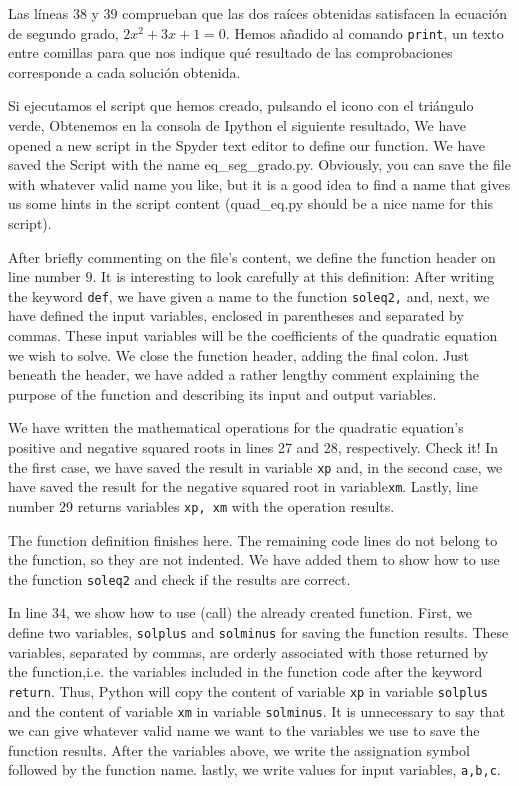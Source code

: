 \begin{paracol}{2}
     Las líneas $38$ y $39$ comprueban que las dos raíces obtenidas satisfacen la ecuación de segundo grado, $2x^2+3x+1 = 0$. Hemos añadido al comando \texttt{print}, un texto entre comillas para que nos indique qué resultado de las comprobaciones corresponde a cada solución obtenida.

     Si ejecutamos el script que hemos creado, pulsando el icono con el triángulo verde, Obtenemos en la consola de Ipython el siguiente resultado,
     \switchcolumn
     We have opened a new script in the Spyder text editor to define our function. We have saved the Script with the name {eq\_seg\_grado.py}. Obviously, you can save the file with whatever valid name you like, but it is a good idea to find a name that gives us some hints in the script content (quad\_eq.py should be a nice name for this script). 

     After briefly commenting on the file's content, we define the function header on line number $9$. It is interesting to look carefully at this definition: After writing the keyword \texttt{def}, we have given a name to the function \texttt{soleq2,} and, next, we have defined the input variables, enclosed in parentheses and separated by commas. These input variables will be the coefficients of the quadratic equation we wish to solve. We close the function header, adding the final colon. Just beneath the header, we have added a rather lengthy comment explaining the purpose of the function and describing its input and output variables.

     We have written the mathematical operations for the quadratic equation's positive and negative squared roots in lines 27 and 28, respectively. Check it! In the first case, we have saved the result in variable \texttt{xp} and, in the second case, we have saved the result for the negative squared root in variable\texttt{xm}. Lastly, line number $29$ returns variables \texttt{xp, xm} with the operation results.

     The function definition finishes here. The remaining code lines do not belong to the function, so they are not indented. We have added them to show how to use the function \texttt{soleq2} and check if the results are correct.

     In line $34$, we show how to use (call) the already created function. First, we define two variables, \texttt{solplus} and \texttt{solminus} for saving the function results.
     These variables, separated by commas, are orderly associated with those returned by the function,i.e. the variables included in the function code after the keyword \texttt{return}. Thus, Python will copy the content of variable \texttt{xp} in variable \texttt{solplus} and the content of variable \texttt{xm} in variable \texttt{solminus}. It is unnecessary to say that we can give whatever valid name we want to the variables we use to save the function results. After the variables above, we write the assignation symbol followed by the function name. lastly, we write values for input variables, \texttt{a,b,c}.


\end{paracol}

